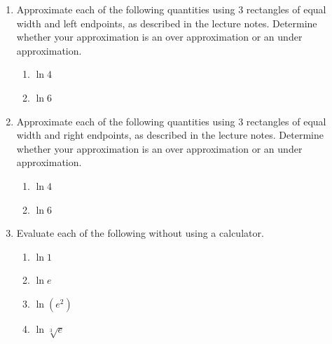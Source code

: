 \documentclass[12pt]{article}
\newif\ifans
\begin{document}
\begin{enumerate}

\item Approximate each of the following quantities using 3 rectangles of equal width and left endpoints, as described in the lecture notes.  Determine whether your approximation is an over approximation or an under approximation.

\begin{enumerate}

\item $\ln{4}$

\ifans\fbox{1.833333333; over approximation}\fi

\item $\ln{6}$

\ifans\fbox{2.676282051; over approximation}\fi

\end{enumerate}

\item Approximate each of the following quantities using 3 rectangles of equal width and right endpoints, as described in the lecture notes.   Determine whether your approximation is an over approximation or an under approximation.

\begin{enumerate}

\item $\ln{4}$

\ifans{\fbox{1.083333333; under approximation}}\fi

\item $\ln{6}$

\ifans{\fbox{1.287393162; under approximation}}\fi

\end{enumerate}

\item Evaluate each of the following without using a calculator.

\begin{enumerate}

\item $\ln{1}$

\ifans\fbox{0}\fi

\item $\ln{e}$

\ifans\fbox{1}\fi

\item $\ln(e^2)$

\ifans\fbox{2}\fi

\item $\ln{\sqrt[3]{e}}$


\end{enumerate}
\end{enumerate}
\end{document}
